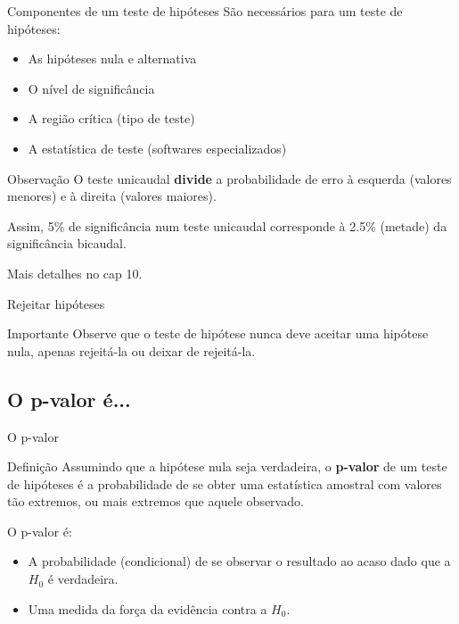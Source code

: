 \documentclass{beamer}
\begin{document}
\begin{frame}{\scriptsize Componentes de um teste de hipóteses}
  São necessários para um teste de hipóteses:
  \begin{itemize}
    \footnotesize
  \item As hipóteses nula e alternativa
  \item O nível de significância
  \item A região crítica (tipo de teste)
  \item A estatística de teste (softwares especializados)
  \end{itemize}
  \begin{block}{Observação}
    \footnotesize
    O teste unicaudal {\bf divide} a probabilidade de erro à esquerda (valores menores) e à direita (valores maiores).

    \bigskip
    Assim, 5\% de significância num teste unicaudal corresponde à 2.5\% (metade) da significância bicaudal.

    \bigskip
    Mais detalhes no cap 10.
  \end{block}
\end{frame}

\begin{frame}{\scriptsize Rejeitar hipóteses}
  \begin{block}{Importante}
    \footnotesize
    Observe que o teste de hipótese nunca deve \alert{aceitar} uma
    hipótese nula, apenas rejeitá-la ou deixar de rejeitá-la.
  \end{block}
\end{frame}

\subsection{O p-valor é...}

\begin{frame}{\scriptsize O p-valor}
  \begin{block}{Definição}
    \footnotesize
    Assumindo que a hipótese nula seja verdadeira, o {\bf p-valor} de
    um teste de hipóteses é a probabilidade de se obter uma
    estatística amostral com valores \alert{tão extremos, ou mais
      extremos} que aquele observado.
  \end{block}

  O p-valor \alert{é}:
  \begin{itemize}
    \footnotesize
  \item A probabilidade (condicional) de se observar o resultado ao
    acaso \alert{dado que} a $H_0$ é verdadeira.
  \item Uma medida da força da evidência \alert{contra} a $H_0$.
  \end{itemize}
\end{frame}
\end{document}
